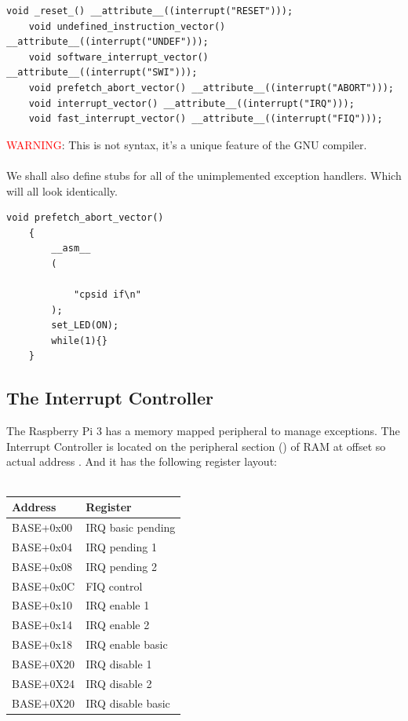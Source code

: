 \documentclass[12pt, svgnames]{book}
\begin{document}
\begin{lstlisting}[style=c]
	void _reset_() __attribute__((interrupt("RESET")));
	void undefined_instruction_vector() __attribute__((interrupt("UNDEF")));
	void software_interrupt_vector() __attribute__((interrupt("SWI")));
	void prefetch_abort_vector() __attribute__((interrupt("ABORT")));
	void interrupt_vector() __attribute__((interrupt("IRQ")));
	void fast_interrupt_vector() __attribute__((interrupt("FIQ")));
\end{lstlisting}

\textcolor{red}{WARNING}: This is not  syntax, it's a unique feature of the GNU compiler.
\\~\\
We shall also define stubs for all of the unimplemented exception handlers. Which will all look identically.
\begin{lstlisting}[style=c]
	void prefetch_abort_vector()
	{
		__asm__
		(
			
			"cpsid if\n"
		);
		set_LED(ON);
		while(1){}
	}
\end{lstlisting}

\subsection{The Interrupt Controller}

The Raspberry Pi 3 has a memory mapped peripheral to manage exceptions. The Interrupt Controller is located on the peripheral section () of RAM at offset  so actual address . And it has the following register layout:
\\~\\
\begin{center}
		{
			\begin{tabular}{|l | l|}
				\hline
				Address & Register\\
				\hline
				BASE+0x00 & IRQ basic pending\\
				BASE+0x04 & IRQ pending 1\\
				BASE+0x08 & IRQ pending 2\\
				BASE+0x0C & FIQ control\\
				BASE+0x10 & IRQ enable 1\\
				BASE+0x14 & IRQ enable 2\\
				BASE+0x18 & IRQ enable basic\\
				BASE+0X20 & IRQ disable 1\\
				BASE+0X24 & IRQ disable 2\\
				BASE+0X20 & IRQ disable basic\\
				\hline
			\end{tabular}
		}
\end{center}
\end{document}
